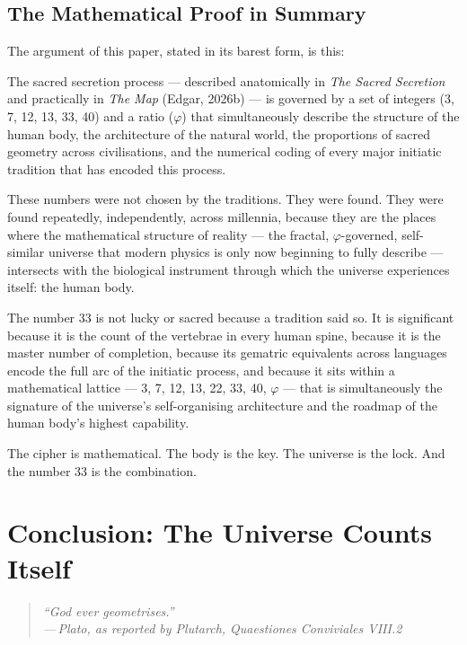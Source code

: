 \documentclass[12pt, a4paper]{article}
\newcommand{\epigraph}[2]{%
  \begin{quote}
    \itshape ``#1''\\[0.3em]
    \normalfont\small\hfill ---\,#2
  \end{quote}
}
\begin{document}
\subsection{The Mathematical Proof in Summary}

The argument of this paper, stated in its barest form, is this:

The sacred secretion process — described anatomically in \emph{The Sacred
Secretion} and practically in \emph{The Map} (Edgar, 2026b) — is governed by
a set of integers (3, 7, 12, 13, 33, 40) and a ratio ($\varphi$) that
simultaneously describe the structure of the human body, the architecture of
the natural world, the proportions of sacred geometry across civilisations, and
the numerical coding of every major initiatic tradition that has encoded this
process.

These numbers were not chosen by the traditions. They were found. They were
found repeatedly, independently, across millennia, because they are the places
where the mathematical structure of reality — the fractal, $\varphi$-governed,
self-similar universe that modern physics is only now beginning to fully
describe — intersects with the biological instrument through which the universe
experiences itself: the human body.

The number 33 is not lucky or sacred because a tradition said so. It is
significant because it is the count of the vertebrae in every human spine,
because it is the master number of completion, because its gematric equivalents
across languages encode the full arc of the initiatic process, and because it
sits within a mathematical lattice — 3, 7, 12, 13, 22, 33, 40, $\varphi$ —
that is simultaneously the signature of the universe's self-organising
architecture and the roadmap of the human body's highest capability.

The cipher is mathematical. The body is the key. The universe is the lock.
And the number 33 is the combination.

\section{Conclusion: The Universe Counts Itself}
\label{sec:conclusion}

\epigraph{God ever geometrises.}{Plato, as reported by Plutarch,
\emph{Quaestiones Conviviales} VIII.2}
\end{document}
